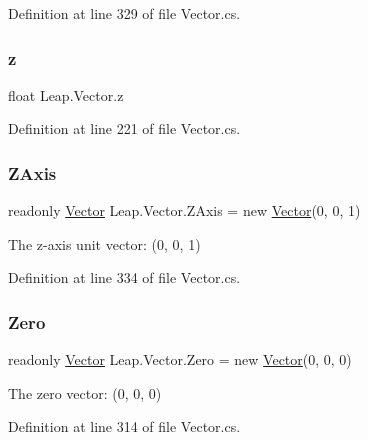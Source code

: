 Definition at line 329 of file Vector.\+cs.

\mbox{\label{struct_leap_1_1_vector_afd2f32c0771e6e15fcef62f0fbf57658}} 
\subsubsection{\texorpdfstring{z}{z}}
{\footnotesize\ttfamily float Leap.\+Vector.\+z}



Definition at line 221 of file Vector.\+cs.

\mbox{\label{struct_leap_1_1_vector_a2b2f1a3a9334e812e832e3b1b6cd4384}} 
\subsubsection{\texorpdfstring{ZAxis}{ZAxis}}
{\footnotesize\ttfamily readonly \mbox{\hyperlink{struct_leap_1_1_vector}{Vector}} Leap.\+Vector.\+Z\+Axis = new \mbox{\hyperlink{struct_leap_1_1_vector}{Vector}}(0, 0, 1)\hspace{0.3cm}{\ttfamily [static]}}



The z-\/axis unit vector\+: (0, 0, 1) 



Definition at line 334 of file Vector.\+cs.

\mbox{\label{struct_leap_1_1_vector_a007c4ee68aa890118b7a2d24aa4d9a6b}} 
\subsubsection{\texorpdfstring{Zero}{Zero}}
{\footnotesize\ttfamily readonly \mbox{\hyperlink{struct_leap_1_1_vector}{Vector}} Leap.\+Vector.\+Zero = new \mbox{\hyperlink{struct_leap_1_1_vector}{Vector}}(0, 0, 0)\hspace{0.3cm}{\ttfamily [static]}}



The zero vector\+: (0, 0, 0) 



Definition at line 314 of file Vector.\+cs.



